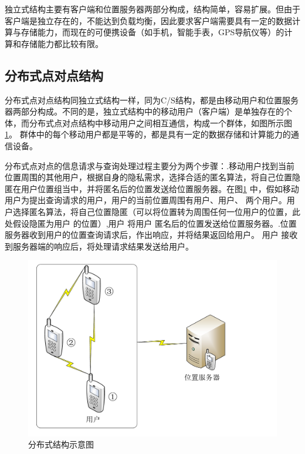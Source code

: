 独立式结构主要有客户端和位置服务器两部分构成，结构简单，容易扩展。但由于客户端是独立存在的，不能达到负载均衡，因此要求客户端需要具有一定的数据计算与存储能力，而现在的可便携设备（如手机，智能手表，GPS导航仪等）的计算和存储能力都比较有限。
\subsection{分布式点对点结构}
分布式点对点结构\cite{Gruteser}同独立式结构一样，同为C/S结构，都是由移动用户和位置服务器两部分构成。不同的是，独立式结构中的移动用户（客户端）是单独存在的个体，而分布式点对点结构中移动用户之间相互通信，构成一个群体，如图所示图\ref{fig:p2p_pdf}。 群体中的每个移动用户都是平等的，都是具有一定的数据存储和计算能力的通信设备。

分布式点对点的信息请求与查询处理过程主要分为两个步骤：.移动用户找到当前位置周围的其他用户，根据自身的隐私需求，选择合适的匿名算法，将自己位置隐匿在用户位置组当中，并将匿名后的位置发送给位置服务器。在图\ref{fig:p2p_pdf} 中，假如移动用户为提出查询请求的用户，用户的当前位置周围有用户、用户、 两个用户。用户选择匿名算法，将自己位置隐匿（可以将位置转为周围任何一位用户的位置，此处假设隐匿为用户 的位置）,用户 将用户 匿名后的位置发送给位置服务器。.位置服务器收到用户的位置查询请求后，作出响应，并将结果返回给用户。 用户 接收到服务器端的响应后，将处理请求结果发送给用户。


\begin{figure}[H]
\centering
\includegraphics[width=12cm]{fig/p2p.pdf}
\caption{分布式结构示意图} %
\label{fig:p2p_pdf}
\end{figure}

